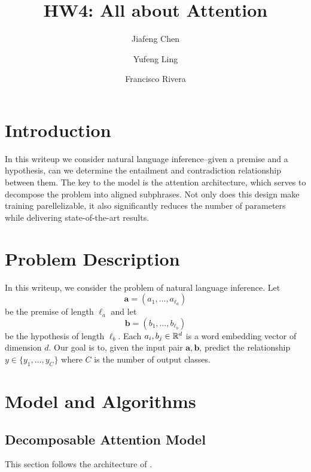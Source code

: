 \documentclass[12pt]{article}
\title{HW4: All about Attention}
\author{Jiafeng Chen \and Yufeng Ling \and
Francisco Rivera}
\begin{document}
\maketitle

\section{Introduction}
In this writeup we consider natural language inference--given a premise and a hypothesis, can we determine the entailment and contradiction relationship between them. The key to the model is the attention architecture, which serves to decompose the problem into aligned subphrases. Not only does this design make training parellelizable, it also significantly reduces the number of parameters while delivering state-of-the-art results.

\section{Problem Description}
In this writeup, we consider the problem of natural language inference. Let 
\begin{equation}
	\bm a = (a_1, \dots, a_{\ell_a})
\end{equation}
be the premise of length $\ell_a$ and let
\begin{equation}
	\bm b = (b_1, \dots, b_{\ell_b})
\end{equation}
be the hypothesis of length $\ell_b$. Each $a_i, b_j \in \mathbb{R}^d$ is a word embedding vector of dimension $d$. Our goal is to, given the input pair $\bm a, \bm b$, predict the relationship $y \in \{y_1, \dots, y_C\}$ where $C$ is the number of output classes.

\section{Model and Algorithms}

\subsection{Decomposable Attention Model}
\label{sub:decomp_attn}
This section follows the architecture of \cite{parikh2016decomposable}.
\end{document}
